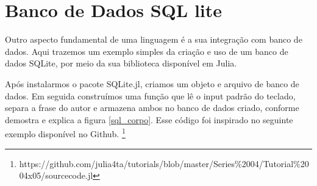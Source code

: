 

\section{Banco de Dados SQL lite}
Outro aspecto fundamental de uma linguagem é a sua integração com banco de dados. Aqui trazemos um exemplo simples da criação e uso de um banco de dados SQLite, por meio da sua biblioteca disponível em Julia. 

Após instalarmos o pacote SQLite.jl, criamos um objeto e arquivo de banco de dados. Em seguida construímos uma função que lê o input padrão do teclado, separa a frase do autor e armazena ambos no banco de dados criado, conforme demostra e explica a figura \ref{sql_corpo}.
Esse código foi inspirado no seguinte exemplo disponível no Github. \footnote{https://github.com/julia4ta/tutorials/blob/master/Series\%2004/Tutorial\%2004x05/sourcecode.jl}


